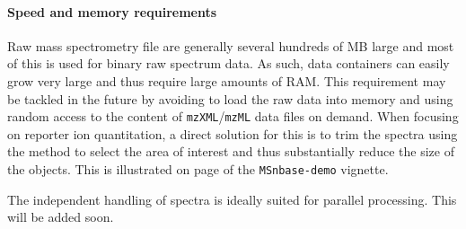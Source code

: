 \paragraph{Speed and memory requirements} Raw mass spectrometry file are generally several 
hundreds of MB large and most of this is used for binary raw spectrum data. As such, 
data containers can easily grow very large and thus require large amounts of RAM. 
This requirement may be tackled in the future by avoiding to load the raw data into memory
and using random access to the content of \texttt{mzXML}/\texttt{mzML} data files on demand. 
When focusing on reporter ion quantitation, a direct solution for this is to trim the 
spectra using the  method to select the area of interest and thus 
substantially reduce the size of the  objects. This is illustrated on page 
\pageref{trimMz-example} of the \texttt{MSnbase-demo} vignette.

The independent handling of spectra is ideally suited for parallel processing. 
This will be added soon.



